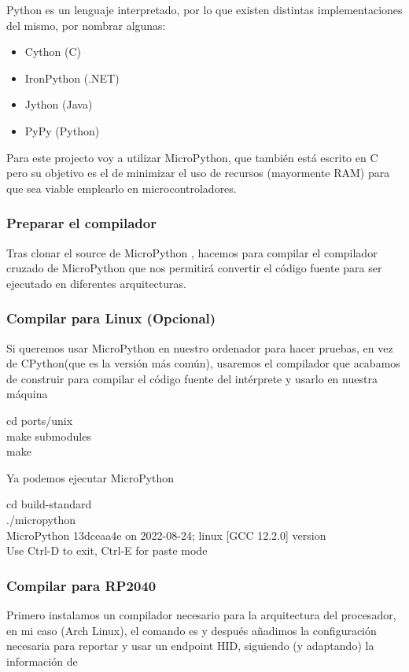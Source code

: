 Python es un lenguaje interpretado, por lo que existen distintas implementaciones del mismo, por nombrar algunas: 
\begin{itemize}
  \item Cython (C)
  \item IronPython (.NET)
  \item Jython (Java)
  \item PyPy (Python)
\end{itemize}
Para este projecto voy a utilizar MicroPython, que también está escrito en C pero su objetivo es el de minimizar el uso de recursos (mayormente RAM) para que sea viable emplearlo en microcontroladores.

\subsubsection{Preparar el compilador}
Tras clonar el source de MicroPython , hacemos  para compilar el compilador cruzado de MicroPython que nos permitirá convertir el código fuente para ser ejecutado en diferentes arquitecturas.

\subsubsection{Compilar para Linux (Opcional)}
Si queremos usar MicroPython en nuestro ordenador para hacer pruebas, en vez de CPython(que es la versión más común), usaremos el compilador que acabamos de construir para compilar el código fuente del intérprete y usarlo en nuestra máquina 
\begin{multicli}
  \cliarrow cd ports/unix \\
  \cliarrow make submodules \\
  \cliarrow make
\end{multicli}

Ya podemos ejecutar MicroPython
\begin{multicli}
  \cliarrow cd build-standard \\
  \cliarrow ./micropython \\
  MicroPython 13dceaa4e on 2022-08-24; linux [GCC 12.2.0] version \\
  Use Ctrl-D to exit, Ctrl-E for paste mode
\end{multicli}

\subsubsection{Compilar para RP2040}
Primero instalamos un compilador necesario para la arquitectura del procesador, en mi caso (Arch Linux), el comando es  y después añadimos la configuración necesaria para reportar y usar un endpoint HID, siguiendo (y adaptando) la información de  \newpage
{}


